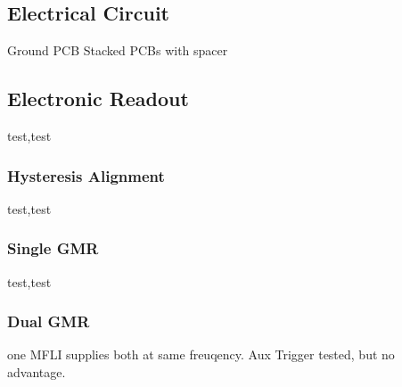 \subsection{Electrical Circuit}
Ground
PCB
Stacked PCBs with spacer
\subsection{Electronic Readout}
test,test
\subsubsection{Hysteresis Alignment}
test,test
\subsubsection{Single GMR}
test,test
\subsubsection{Dual GMR}
one MFLI supplies both at same freuqency. Aux Trigger tested, but no advantage.


